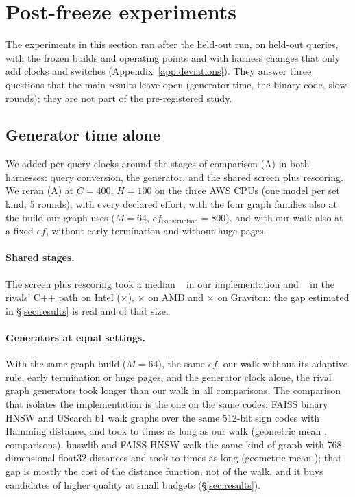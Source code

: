\section{Post-freeze experiments}\label{sec:post}

The experiments in this section ran after the held-out run, on held-out queries, with the frozen builds
and operating points and with harness changes that only add clocks and switches (Appendix~\ref{app:deviations}).
They answer three questions that the main results leave open (generator time, the binary code, slow rounds); they are not part of the pre-registered study.

\subsection{Generator time alone}

We added per-query clocks around the stages of comparison (A) in both harnesses: query conversion, the
generator, and the shared screen plus rescoring. We reran (A) at $C = 400$, $H = 100$ on the three AWS CPUs
(one model per set kind, 5 rounds), with every declared effort, with the four graph families also at the
build our graph uses ($M = 64$, $ef_{\text{construction}} = 800$), and with our walk also at a fixed $ef$,
without early termination and without huge pages.

\paragraph{Shared stages.} The screen plus rescoring took a median ~\us{} in our
implementation and ~\us{} in the rivals' C++ path on Intel
($\times$), $\times$ on AMD and $\times$ on
Graviton: the gap estimated in \S\ref{sec:results} is real and of that size.

\paragraph{Generators at equal settings.} With the same graph build ($M = 64$), the same $ef$, our walk
without its adaptive rule, early termination or huge pages, and the generator clock alone, the rival
graph generators took longer than our walk in all  comparisons. The comparison that isolates the
implementation is the one on the same codes: FAISS binary HNSW and USearch b1 walk graphs over the same 512-bit sign
codes with Hamming distance, and took  to  times as long as our walk (geometric mean
,  comparisons). hnswlib and FAISS HNSW walk the same kind of graph with 768-dimensional
float32 distances and took  to  times as long (geometric mean ); that
gap is mostly the cost of the distance function, not of the walk, and it buys candidates of higher quality at small
budgets (\S\ref{sec:results}).

